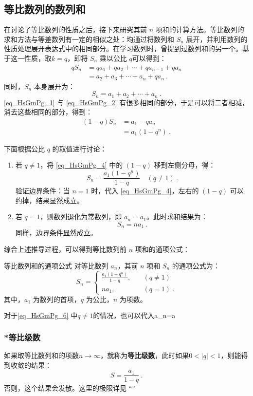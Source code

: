 \subsection{等比数列的数列和}

在讨论了等比数列的性质之后，接下来研究其前 $n$ 项和的计算方法。等比数列的求和方法与等差数列有一定的相似之处：均通过将数列和 $S_n$ 展开，并利用数列的性质处理展开表达式中的相同部分。在学习数列时，曾提到过数列和的另一个。基于这一性质，取$k=q$，即将 $S_n$ 乘以公比 $q$可以得到：
\begin{equation}\label{eq_HsGmPg_1}
\begin{aligned}
qS_n &= qa_1 + qa_2 + \cdots + qa_{n-1} + qa_n\\
&= a_2 + a_3 + \cdots + a_n + qa_n~.
\end{aligned}
\end{equation}
同时，$S_n$ 本身展开为：
\begin{equation}\label{eq_HsGmPg_2}
S_n = a_1 + a_2 + \cdots + a_n~.
\end{equation}
\autoref{eq_HsGmPg_1} 与 \autoref{eq_HsGmPg_2} 有很多相同的部分，于是可以将二者相减，消去这些相同的部分，得到：
\begin{equation}\label{eq_HsGmPg_4}
\begin{aligned}
(1 - q)S_n &= a_1 - qa_n \\
&= a_1(1 - q^n)~.
\end{aligned}
\end{equation}

下面根据公比 $q$ 的取值进行讨论：
\begin{enumerate}
\item 若 $q \neq 1$，将 \autoref{eq_HsGmPg_4} 中的 $(1 - q)$ 移到左侧分母，得：
\begin{equation}
S_n = \frac{a_1(1 - q^n)}{1 - q} \quad (q \neq 1)~.
\end{equation}
验证边界条件：当 $n = 1$ 时，代入 \autoref{eq_HsGmPg_4}，左右的 $(1 - q)$ 可以约掉，结果显然成立。
\item 若 $q = 1$，则数列退化为常数列，即 $a_n = a_1$。此时求和结果为：
\begin{equation}
S_n = na_1~.
\end{equation}
同样，边界条件显然成立。
\end{enumerate}

综合上述推导过程，可以得到等比数列前 $n$ 项和的通项公式：
\begin{corollary}{等比数列和的通项公式}
对等比数列 ${a_n}$，其前 $n$ 项和 $S_n$ 的通项公式为：
\begin{equation}\label{eq_HsGmPg_6}
S_n = \begin{cases}
\displaystyle\frac{a_1(1 - q^n)}{1 - q}, & \quad (q \neq 1) \\
na_1, & \quad (q = 1)~.
\end{cases}
\end{equation}
其中，$a_1$ 为数列的首项，$q$ 为公比，$n$ 为项数。
\end{corollary}
对于\autoref{eq_HsGmPg_6} 中$q\neq1$的情况，也可以代入a_n=a
\subsubsection{*等比级数}

如果取等比数列和的项数$n\rightarrow \infty$，就称为\textbf{等比级数}，此时如果$0<|q|<1$，则能得到收敛的结果：
\begin{equation}
S = \frac{a_1}{1 - q}~.
\end{equation}
否则，这个结果会发散。这里的极限详见 “”